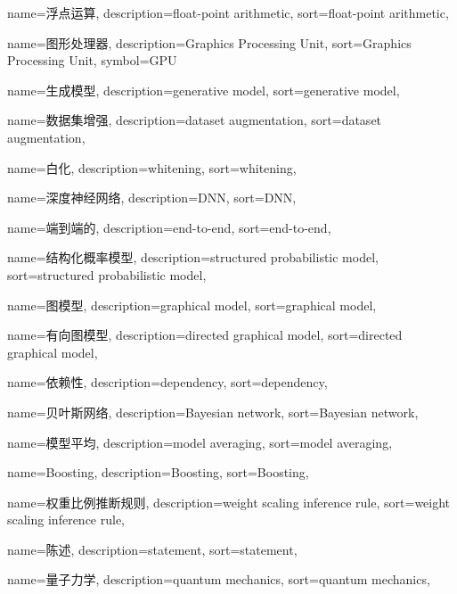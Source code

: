 {
  name=浮点运算,
  description={float-point arithmetic},
  sort={float-point arithmetic},
}

{
  name=图形处理器,
  description={Graphics Processing Unit},
  sort={Graphics Processing Unit},
  symbol={GPU}
}

{
  name=生成模型,
  description={generative model},
  sort={generative model},
}

{
  name=数据集增强,
  description={dataset augmentation},
  sort={dataset augmentation},
}

{
  name=白化,
  description={whitening},
  sort={whitening},
}

{
  name=深度神经网络,
  description={DNN},
  sort={DNN},
}

{
  name=端到端的,
  description={end-to-end},
  sort={end-to-end},
}

{
  name=结构化概率模型,
  description={structured probabilistic model},
  sort={structured probabilistic model},
}

{
  name=图模型,
  description={graphical model},
  sort={graphical model},
}

{
  name=有向图模型,
  description={directed graphical model},
  sort={directed graphical model},
}

{
  name=依赖性,
  description={dependency},
  sort={dependency},
}

{
  name=贝叶斯网络,
  description={Bayesian network},
  sort={Bayesian network},
}

{
  name=模型平均,
  description={model averaging},
  sort={model averaging},
}

{
  name=Boosting,
  description={Boosting},
  sort={Boosting},
}

{
  name=权重比例推断规则,
  description={weight scaling inference rule},
  sort={weight scaling inference rule},
}

{
  name=陈述,
  description={statement},
  sort={statement},
}

{
  name=量子力学,
  description={quantum mechanics},
  sort={quantum mechanics},
}

